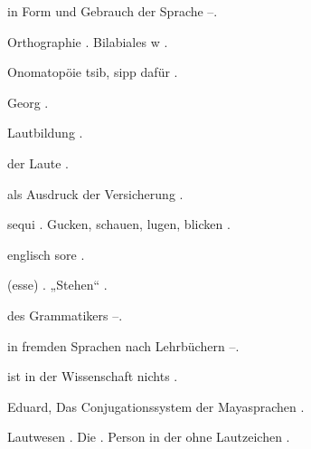 \begin{register}
 in Form und Gebrauch der Sprache \pageref{sp.97}–\pageref{sp.98}.

 Orthographie \pageref{sp.133}. Bilabiales w \pageref{sp.188}.

 Onomatopöie tsib, sipp dafür \pageref{sp.154}.

 Georg \pageref{sp.69}.

 Lautbildung \pageref{sp.34}.

 der Laute \pageref{sp.201}.

 als Ausdruck der Versicherung \pageref{sp.183}.


 sequi \pageref{sp.153}. Gucken, schauen, lugen, blicken \pageref{sp.238}.

 englisch sore \pageref{sp.153}.

 (esse) \pageref{sp.103}. „Stehen“ \pageref{sp.326}.

 des Grammatikers \pageref{sp.83}–\pageref{sp.84}.

 in fremden Sprachen nach Lehrbüchern \pageref{sp.73}–\pageref{sp.74}.

 ist in der Wissenschaft nichts \pageref{sp.120}.

 Eduard, Das Conjugationssystem der Mayasprachen \pageref{sp.257}.


 Lautwesen \pageref{sp.34}. Die \pageref{sp.3}. Person in der  ohne Lautzeichen \pageref{sp.393}.


\end{register}
